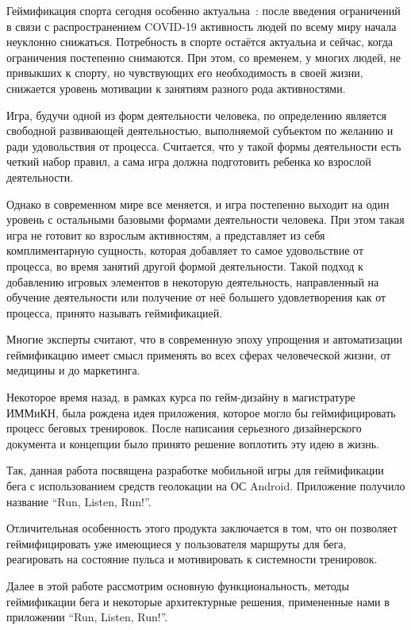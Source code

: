 \Intro

Геймификация спорта сегодня особенно актуальна~\autocite{gamification}: после введения ограничений в связи с распространением COVID-19 активность людей по всему миру начала неуклонно снижаться. Потребность в спорте остаётся актуальна и сейчас, когда ограничения постепенно снимаются. При этом, со временем, у многих людей, не привыкших к спорту, но чувствующих его необходимость в своей жизни, снижается уровень мотивации к занятиям разного рода активностями. 

Игра, будучи одной из форм деятельности человека, по определению является свободной развивающей деятельностью, выполняемой субъектом по желанию и ради удовольствия от процесса. Считается, что у такой формы деятельности есть четкий набор правил, а сама игра должна подготовить ребенка ко взрослой деятельности.

Однако в современном мире все меняется, и игра постепенно выходит на один уровень с остальными базовыми формами деятельности человека. При этом такая игра не готовит ко взрослым активностям, а представляет из себя комплиментарную сущность, которая добавляет то самое удовольствие от процесса, во время занятий другой формой деятельности. Такой подход к добавлению игровых элементов в некоторую деятельность, направленный на обучение деятельности или получение от неё большего удовлетворения как от процесса, принято называть геймификацией.  

Многие эксперты считают, что в современную эпоху упрощения и автоматизации геймификацию имеет смысл применять во всех сферах человеческой жизни, от медицины и до маркетинга.

Некоторое время назад, в рамках курса по гейм-дизайну в магистратуре ИММиКН, была рождена идея приложения, которое могло бы геймифицировать процесс беговых тренировок. После написания серьезного дизайнерского документа и концепции было принято решение воплотить эту идею в жизнь.

Так, данная работа посвящена разработке мобильной игры для геймификации бега с использованием средств геолокации на ОС Android. Приложение получило название ``Run, Listen, Run!''.

Отличительная особенность этого продукта заключается в том, что он позволяет геймифицировать уже имеющиеся у пользователя маршруты для бега, реагировать на состояние пульса и мотивировать к системности тренировок.

Далее в этой работе рассмотрим основную функциональность, методы геймификации бега и некоторые архитектурные решения, примененные нами в приложении ``Run, Listen, Run!''.


